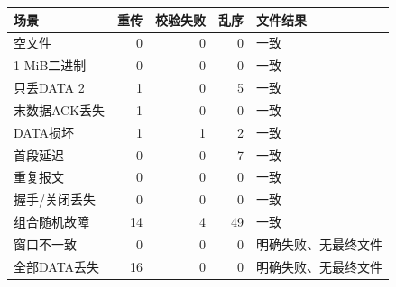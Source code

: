 \begin{tabular}{lrrrl}\toprule
场景 & 重传 & 校验失败 & 乱序 & 文件结果 \\ \midrule
空文件 & 0 & 0 & 0 & 一致 \\
1 MiB二进制 & 0 & 0 & 0 & 一致 \\
只丢DATA 2 & 1 & 0 & 5 & 一致 \\
末数据ACK丢失 & 1 & 0 & 0 & 一致 \\
DATA损坏 & 1 & 1 & 2 & 一致 \\
首段延迟 & 0 & 0 & 7 & 一致 \\
重复报文 & 0 & 0 & 0 & 一致 \\
握手/关闭丢失 & 0 & 0 & 0 & 一致 \\
组合随机故障 & 14 & 4 & 49 & 一致 \\
窗口不一致 & 0 & 0 & 0 & 明确失败、无最终文件 \\
全部DATA丢失 & 16 & 0 & 0 & 明确失败、无最终文件 \\
\bottomrule\end{tabular}
